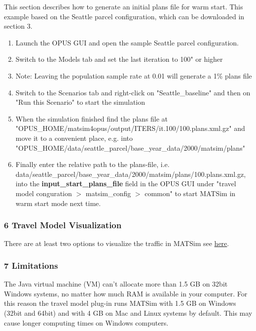 \documentclass[a4paper,11pt]{report}
\begin{document}
This section describes how to generate an initial plans file for warm  start. This example based on the Seattle parcel configuration, which  can be downloaded in section 3.
\begin{enumerate}
	\item Launch the OPUS GUI and open the sample Seattle parcel configuration.
	\item Switch to the Models tab and set the last iteration to 100" or higher
	\item Note: Leaving the population sample rate at 0.01 will generate a 1\% plans file
	\item Switch to the Scenarios tab and right-click on "Seattle\_baseline" and then on "Run this Scenario" to start the simulation
	\item When the simulation finished find the plans file at  "OPUS\_HOME/matsim4opus/output/ITERS/it.100/100.plans.xml.gz" and move it  to a convenient place, e.g. into  "OPUS\_HOME/data/seattle\_parcel/base\_year\_data/2000/matsim/plans"
	\item Finally enter the relative path to the plans-file, i.e.  data/seattle\_parcel/base\_year\_data/2000/matsim/plans/100.plans.xml.gz,  into the \textbf{input\_start\_plans\_file }field in the OPUS GUI  under "travel model conguration $>$ matsim\_config $>$ common" to start  MATSim in warm start mode next time.
\end{enumerate}

\subsubsection{6 Travel Model Visualization}

There are at least two options to visualize the traffic in MATSim see \href{http://matsim.org/node/741}{here}.

\subsubsection{7 Limitations}

The Java virtual machine (VM) can't allocate more than 1.5 GB on  32bit Windows systems, no matter how much RAM is available in your  computer. For this reason the travel model plug-in runs MATSim with 1.5  GB on Windows (32bit and 64bit) and with 4 GB on Mac and Linux systems  by default. This may cause longer computing times on Windows  computers.

\end{document}

